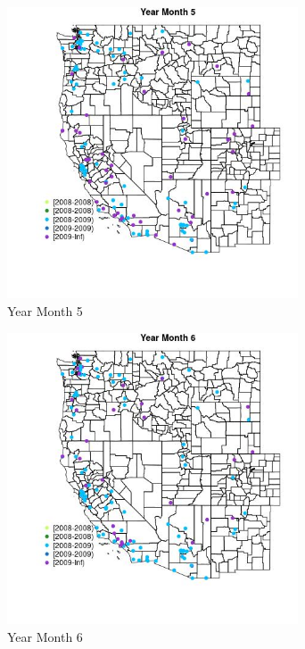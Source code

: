 \begin{figure} 
\centering  
\includegraphics[width=0.77\textwidth]{Code_Outputs/Report_ML_input_PM25_Step4_part_e_de_duplicated_aves_MapObsMo5Year.jpg} 
\caption{\label{fig:Report_ML_input_PM25_Step4_part_e_de_duplicated_avesMapObsMo5Year}Year Month 5} 
\end{figure} 
 

\begin{figure} 
\centering  
\includegraphics[width=0.77\textwidth]{Code_Outputs/Report_ML_input_PM25_Step4_part_e_de_duplicated_aves_MapObsMo6Year.jpg} 
\caption{\label{fig:Report_ML_input_PM25_Step4_part_e_de_duplicated_avesMapObsMo6Year}Year Month 6} 
\end{figure} 
 

